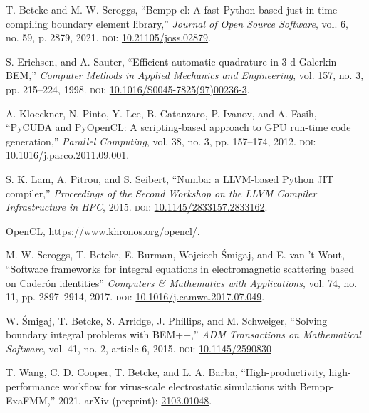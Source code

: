 \documentclass{IEEEcsmag}
\begin{document}

\begin{thebibliography}{1}

T. Betcke and M. W. Scroggs,
``Bempp-cl: A fast Python based just-in-time compiling boundary element library,''
{\it Journal of Open Source Software}, vol. 6, no. 59, p. 2879, 2021.
\textsc{doi}: \href{https://dx.doi.org/10.21105/joss.02879}{10.21105/joss.02879}.

S. Erichsen, and A. Sauter,
``Efficient automatic quadrature in 3-d Galerkin BEM,''
{\it Computer Methods in Applied Mechanics and Engineering}, vol. 157, no. 3, pp. 215--224, 1998.
\textsc{doi}: \href{https://doi.org/10.1016/S0045-7825(97)00236-3}{10.1016/S0045-7825(97)00236-3}.

A. Kloeckner, N. Pinto, Y. Lee, B. Catanzaro, P. Ivanov, and A. Fasih,
``PyCUDA and PyOpenCL: A scripting-based approach to GPU run-time code generation,''
{\it Parallel Computing}, vol. 38, no. 3, pp. 157--174, 2012.
\textsc{doi}: \href{https://dx.doi.org/10.1016/j.parco.2011.09.001}{10.1016/j.parco.2011.09.001}.

S. K. Lam, A. Pitrou, and S. Seibert,
``Numba: a LLVM-based Python JIT compiler,''
{\it Proceedings of the Second Workshop on the LLVM Compiler Infrastructure in HPC}, 2015.
\textsc{doi}: \href{https://dx.doi.org/10.1145/2833157.2833162}{10.1145/2833157.2833162}.

OpenCL, \url{https://www.khronos.org/opencl/}.

M. W. Scroggs, T. Betcke, E. Burman, Wojciech \'{S}migaj, and E. van 't Wout,
``Software frameworks for integral equations in electromagnetic scattering based on Cader\'{o}n identities''
{\it Computers \& Mathematics with Applications}, vol. 74, no. 11, pp. 2897--2914, 2017.
\textsc{doi}: \href{https://doi.org/10.1016/j.camwa.2017.07.049}{10.1016/j.camwa.2017.07.049}.

W. \'{S}migaj, T. Betcke, S. Arridge, J. Phillips, and M. Schweiger,
``Solving boundary integral problems with BEM++,''
{\it ADM Transactions on Mathematical Software}, vol. 41, no. 2, article 6, 2015.
\textsc{doi}: \href{https://doi.org/10.1145/2590830}{10.1145/2590830}
	
T. Wang, C. D. Cooper, T. Betcke, and L. A. Barba,
``High-productivity, high-performance workflow for virus-scale electrostatic simulations with Bempp-ExaFMM,''
2021.
arXiv (preprint): \href{https://arxiv.org/abs/2103.01048}{2103.01048}.
\end{thebibliography}
\end{document}
